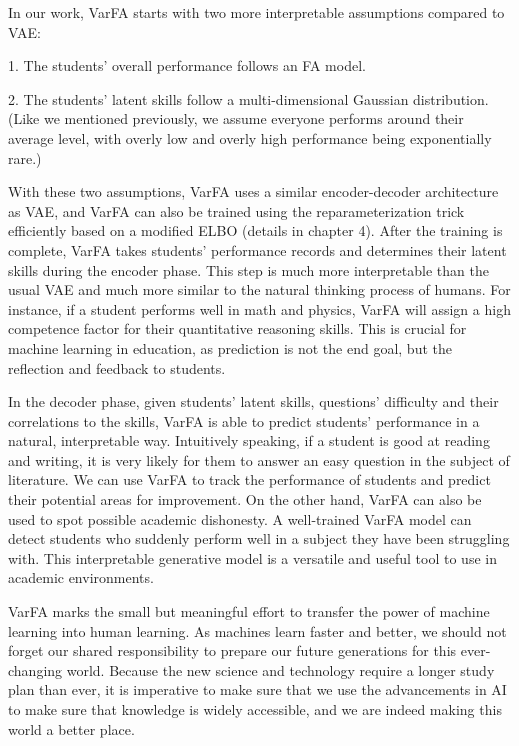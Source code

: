 In our work, VarFA starts with two more interpretable assumptions compared to
VAE:

1. The students' overall performance follows an FA model.

2. The students' latent skills follow a multi-dimensional Gaussian distribution. (Like we mentioned previously, we assume everyone performs around their average level, with overly low and overly high performance being exponentially rare.)

With these two assumptions, VarFA uses a similar encoder-decoder architecture
as VAE, and VarFA can also be trained using the reparameterization trick
efficiently based on a modified ELBO (details in chapter 4). After the training
is complete, VarFA takes students' performance records and determines their
latent skills during the encoder phase. This step is much more interpretable
than the usual VAE and much more similar to the natural thinking process of
humans. For instance, if a student performs well in math and physics, VarFA
will assign a high competence factor for their quantitative reasoning skills.
This is crucial for machine learning in education, as prediction is not the end
goal, but the reflection and feedback to students.

In the decoder phase, given students' latent skills, questions' difficulty and
their correlations to the skills, VarFA is able to predict students'
performance in a natural, interpretable way. Intuitively speaking, if a student
is good at reading and writing, it is very likely for them to answer an easy
question in the subject of literature. We can use VarFA to track the
performance of students and predict their potential areas for improvement. On
the other hand, VarFA can also be used to spot possible academic dishonesty. A
well-trained VarFA model can detect students who suddenly perform well in a
subject they have been struggling with. This interpretable generative model is
a versatile and useful tool to use in academic environments.

VarFA marks the small but meaningful effort to transfer the power of machine
learning into human learning. As machines learn faster and better, we should
not forget our shared responsibility to prepare our future generations for this
ever-changing world. Because the new science and technology require a longer
study plan than ever, it is imperative to make sure that we use the
advancements in AI to make sure that knowledge is widely accessible, and we are
indeed making this world a better place.
